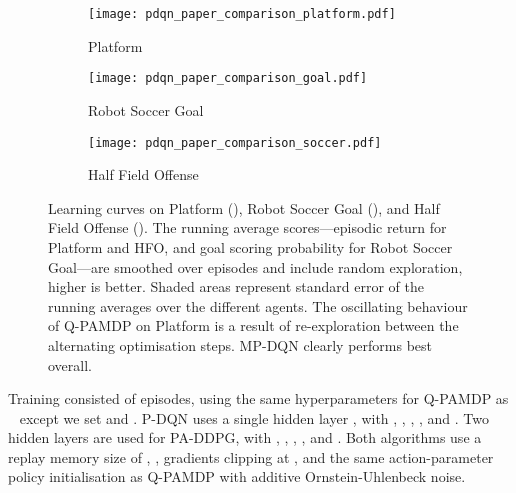 \documentclass{article}
\def\PDQN*{P\nobreakdash-DQN}
\def\MPDQN*{MP\nobreakdash-DQN}
\def\QPAMDP*{Q\nobreakdash-PAMDP}
\def\PADDPG*{PA\nobreakdash-DDPG}
\newcommand{\citet}[1]
{\citeauthor{#1}~\shortcite{#1}}
\begin{document}
\begin{figure}[ht!]
	\begin{subfigure}[t]{\linewidth}
		\centering
		\texttt{[image: pdqn\_paper\_comparison\_platform.pdf]}
		\caption{Platform}
		\label{fig:learning_curves_platform}
	\end{subfigure}
	\vspace*{0.15cm}
	\begin{subfigure}[t]{\linewidth}
		\centering
		\texttt{[image: pdqn\_paper\_comparison\_goal.pdf]}
		\caption{Robot Soccer Goal}
		\label{fig:learning_curves_robot_soccer_goal}
	\end{subfigure}
	\vspace*{0.15cm}
	\begin{subfigure}[t]{\linewidth}
		\centering
		\texttt{[image: pdqn\_paper\_comparison\_soccer.pdf]}
		\caption{Half Field Offense}
		\label{fig:learning_curves_hfo}
	\end{subfigure}
\caption{Learning curves on Platform (), Robot Soccer Goal (), and Half Field Offense (). The running average scores---episodic return for Platform and HFO, and goal scoring probability for Robot Soccer Goal---are smoothed over  episodes and include random exploration, higher is better. Shaded areas represent standard error of the running averages over the different agents. The oscillating behaviour of \QPAMDP* on Platform is a result of re-exploration between the alternating optimisation steps. \MPDQN* clearly performs best overall. }
	\label{fig:learning_curves}
\end{figure}

Training consisted of  episodes, using the same hyperparameters for \QPAMDP* as \citet{masson2016} except we set  and . \PDQN* uses a single hidden layer , with , , , , and . Two hidden layers  are used for \PADDPG*, with , , , , and . Both algorithms use a replay memory size of , , gradients clipping at , and the same action-parameter policy initialisation as \QPAMDP* with additive Ornstein-Uhlenbeck noise.
\end{document}
